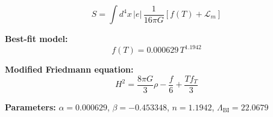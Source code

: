 
\begin{equation}
  S = \int d^4x \, |e| \, \frac{1}{16\pi G} \left[ f(T) + \mathcal{L}_m \right]
\end{equation}

\textbf{Best-fit model:}
\begin{equation}
  f(T) = 0.000629 \, T^{1.1942}
\end{equation}

\textbf{Modified Friedmann equation:}
\begin{equation}
  H^2 = \frac{8\pi G}{3} \rho - \frac{f}{6} + \frac{T f_T}{3}
\end{equation}

\textbf{Parameters:}
$\alpha = 0.000629$, \quad
$\beta = -0.453348$, \quad
$n = 1.1942$, \quad
$\Lambda_{\text{BI}} = 22.0679$